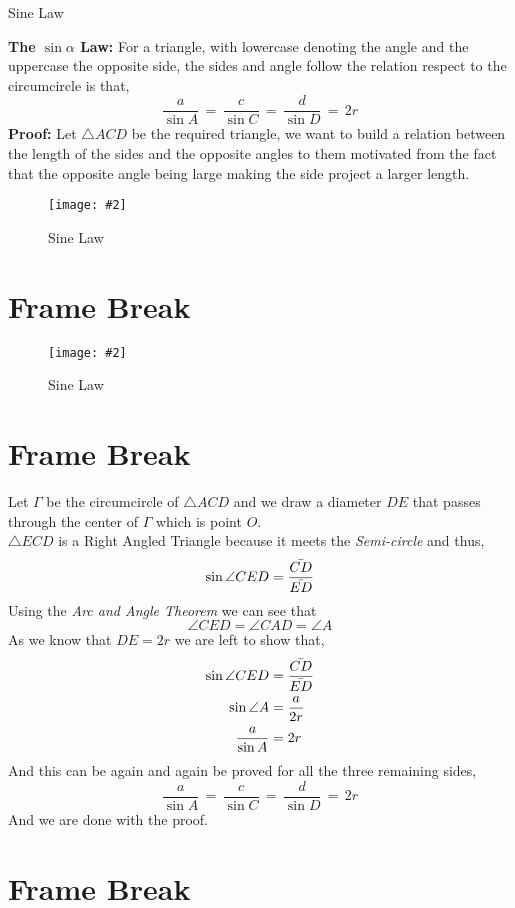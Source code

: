 \documentclass[9pt]{memoir}
\newcommand{\fig}[3]{ \begin{figure} \centering \texttt{[image: \#2]} \caption{#3}  \end{figure}}
\begin{document}
{Sine Law}
{\begin{small}
\textbf{\textsf{The $\sin \alpha$ Law:}} For a triangle, with lowercase denoting the angle and the uppercase the opposite side, the sides and angle follow the relation respect to the circumcircle is that, 
\[ \frac{a}{\sin A} \,=\, \frac{c}{\sin C} \,=\, \frac{d}{\sin D} \, = \, 2r\]
\textbf{\textsf{Proof:}} Let $\triangle ACD$ be the required triangle, we want to build a relation between the length of the sides and the opposite angles to them motivated from the fact that the opposite angle being large making the side project a larger length.
\end{small}}{
\fig{0.8}{sinelawpic.png}{Sine Law}

}

\section{Frame Break}



\fig{0.8}{sinelawpic.png}{Sine Law}
\section{Frame Break}




 Let $\Gamma$ be the circumcircle of $\triangle ACD$ and we draw a diameter $DE$ that passes through the center of $\Gamma$ which is point $O$. \\
 $\triangle ECD$ is a Right Angled Triangle because it meets the \emph{Semi-circle} and thus,
 \[ \sin \angle CED = \frac{\Bar{CD}}{\Bar{ED}}\]
 Using the \emph{Arc and Angle Theorem} we can see that  
 \[ \angle CED = \angle CAD = \angle A \]
 As we know that $DE = 2r$ we are left to show that,
 \begin{align}
 \sin \angle CED &=  \frac{\Bar{CD}}{\Bar{ED}} \notag \\
 \sin \angle A & = \frac{a}{2r} \\
 \frac{a}{\sin A} & = 2r
 \end{align}
 And this can be again and again be proved for all the three remaining sides,
 \begin{equation}
 \frac{a}{\sin A} \,=\, \frac{c}{\sin C} \,=\, \frac{d}{\sin D} \, = \, 2r
 \end{equation}
 And we are done with the proof.
\section{Frame Break}
\end{document}
